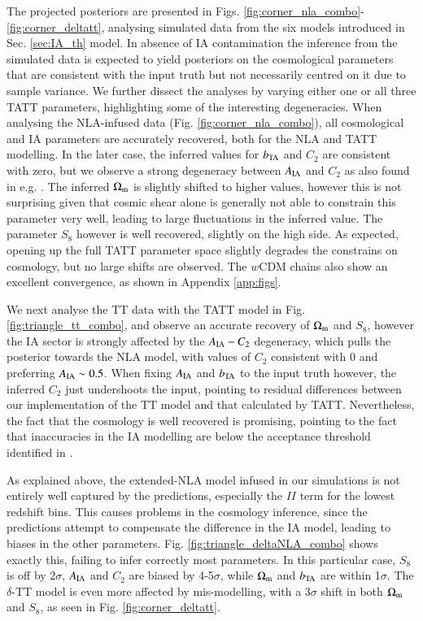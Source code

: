 The projected posteriors  are presented in Figs. \ref{fig:corner_nla_combo}-\ref{fig:corner_deltatt}, analysing simulated data from the six models introduced in Sec. \ref{sec:IA_th} model. In absence of IA contamination the inference from the simulated data is expected to yield posteriors on the cosmological parameters that are consistent with the input truth but not necessarily centred on it due to sample variance. We further dissect the analyses by varying either  one or  all three TATT parameters, highlighting some of the interesting degeneracies.   When analysing the NLA-infused data (Fig. \ref{fig:corner_nla_combo}), all cosmological and IA  parameters are accurately recovered, both for the NLA and TATT modelling. In the later case, the inferred values for $b_{\rm TA}$ and $C_2$ are consistent with zero, but we observe a strong degeneracy between  $A_{\rm IA}$ and  $C_2$ as also found in e.g. \citet[][\it  cite other papers?]{Paopiamsap2024}. The inferred  $\Omega_{\rm m}$ is slightly shifted to higher values, however this is not surprising given that cosmic shear alone is generally not able to constrain this parameter very well, leading to large fluctuations in the inferred value. The parameter $S_8$ however  is well recovered, slightly on the high side. As expected, opening up the full TATT parameter space slightly degrades the constrains on cosmology, but no large shifts are observed. The $w$CDM chains also show an excellent convergence, as shown in Appendix \ref{app:figs}.
 


 We next analyse the TT data with the TATT model in Fig. \ref{fig:triangle_tt_combo}, and  observe an accurate recovery of  $\Omega_{\rm m}$ and $S_8$, however the IA sector is strongly affected by the $A_{\rm IA}- C_2$ degeneracy, which  pulls the posterior towards the NLA model, with values of $C_2$ consistent with 0 and preferring $A_{\rm IA}\sim 0.5$. When fixing $A_{\rm IA}$ and $b_{\rm TA}$ to the input truth however, the inferred $C_2$ just undershoots the input, pointing to residual differences between our implementation of the TT model and that calculated by TATT. Nevertheless, the fact that the cosmology is well recovered is promising, pointing to the fact that inaccuracies in the IA modelling are below the acceptance threshold identified in \citet{Paopiamsap2024}. 


 As explained above, the extended-NLA model infused in our simulations is not entirely well captured by the predictions, especially the $II$ term for the lowest redshift bins. This causes problems in the cosmology inference, since the predictions attempt to compensate the difference in the IA model, leading to biases in the other parameters. Fig. \ref{fig:triangle_deltaNLA_combo} shows exactly this, failing to infer correctly most parameters. In this particular case,   $S_8$ is off by $2\sigma$, $A_{\rm IA}$ and $C_2$ are biased by 4-5$\sigma$, while $\Omega_{\rm m}$ and $b_{\rm TA}$ are within 1$\sigma$. The $\delta$-TT model is even more affected by mis-modelling, with a 3$\sigma$ shift in both $\Omega_{\rm m}$ and $S_8$, as seen in Fig. \ref{fig:corner_deltatt}.
 
